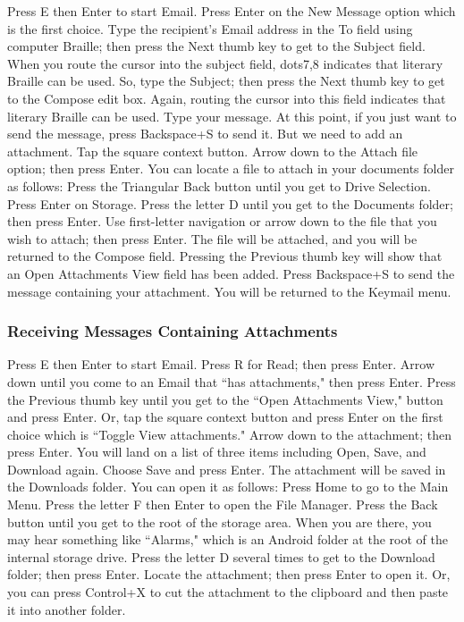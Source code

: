 \documentclass[10pt,letterpaper,twoside]{report}
\begin{document}
{{{Press E then Enter to start Email.
Press Enter on the New Message option which is the first choice.
Type the recipient's Email address in the To field using computer Braille; then press the Next thumb key to get to the Subject field. When you route the cursor into the subject field, dots7,8 indicates that literary Braille can be used. So, type the Subject; then press the Next thumb key to get to the Compose edit box. Again, routing the cursor into this field indicates that literary Braille can be used.
Type your message. At this point, if you just want to send the message, press Backspace+S to send it.
But we need to add an attachment.
Tap the square context button.
Arrow down to the Attach file option; then press Enter. You can locate a file to attach in your documents folder as follows:
Press the Triangular Back button until you get to Drive Selection.
Press Enter on Storage.
Press the letter D until you get to the Documents folder; then press Enter.
Use first-letter navigation or arrow down to the file that you wish to attach; then press Enter. The file will be attached, and you will be returned to the Compose field.
Pressing the Previous thumb key will show that an Open Attachments View field has been added.
Press Backspace+S to send the message containing your attachment. You will be returned to the Keymail menu.

\subsubsection{Receiving Messages Containing Attachments}

Press E then Enter to start Email.
Press R for Read; then press Enter.
Arrow down until you come to an Email that ``has attachments," then press Enter.
Press the Previous thumb key until you get to the ``Open Attachments View," button and press Enter.
Or, tap the square context button and press Enter on the first choice which is ``Toggle View attachments."
Arrow down to the attachment; then press Enter. You will land on a list of three items including Open, Save, and Download again.
Choose Save and press Enter.
The attachment will be saved in the Downloads folder. You can open it as follows:
Press Home to go to the Main Menu.
Press the letter F then Enter to open the File Manager.
Press the Back button until you get to the root of the storage area. When you are there, you may hear something like ``Alarms," which is an Android folder at the root of the internal storage drive.
Press the letter D several times to get to the Download folder; then press Enter.
Locate the attachment; then press Enter to open it.
Or, you can press Control+X to cut the attachment to the clipboard and then paste it into another folder. 

}}}
\end{document}

